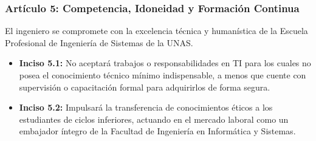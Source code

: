 \documentclass[12pt,a4paper]{article}
\begin{document}
\subsubsection*{Artículo 5: Competencia, Idoneidad y Formación Continua}
El ingeniero se compromete con la excelencia técnica y humanística de la Escuela Profesional de Ingeniería de Sistemas de la UNAS.
\begin{itemize}
    \item \textbf{Inciso 5.1:} No aceptará trabajos o responsabilidades en TI para los cuales no posea el conocimiento técnico mínimo indispensable, a menos que cuente con supervisión o capacitación formal para adquirirlos de forma segura.
    \item \textbf{Inciso 5.2:} Impulsará la transferencia de conocimientos éticos a los estudiantes de ciclos inferiores, actuando en el mercado laboral como un embajador íntegro de la Facultad de Ingeniería en Informática y Sistemas.
\end{itemize}
\end{document}
